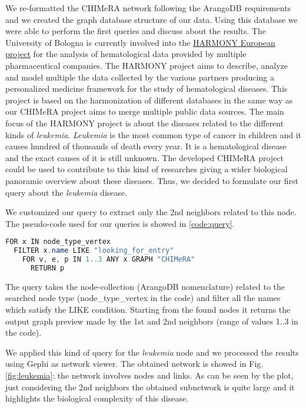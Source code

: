 \documentclass{standalone}
\begin{document}
We re-formatted the \textsf{CHIMeRA} network following the \textsf{ArangoDB} requirements and we created the graph database structure of our data.
Using this database we were able to perform the first queries and discuss about the results.
The University of Bologna is currently involved into the \href{https://www.harmony-alliance.eu/}{HARMONY European project} for the analysis of hematological data provided by multiple pharmaceutical companies.
The HARMONY project aims to describe, analyze and model multiple the data collected by the various partners producing a personalized medicine framework for the study of hematological diseases.
This project is based on the harmonization of different databases in the same way as our \textsf{CHIMeRA} project aims to merge multiple public data sources.
The main focus of the HARMONY project is about the diseases related to the different kinds of \emph{leukemia}.
\emph{Leukemia} is the most common type of cancer in children and it causes hundred of thousands of death every year.
It is a hematological disease and the exact causes of it is still unknown.
The developed \textsf{CHIMeRA} project could be used to contribute to this kind of researches giving a wider biological panoramic overview about these diseases.
Thus, we decided to formulate our first query about the \emph{leukemia} disease.

We customized our query to extract only the 2nd neighbors related to this node.
The pseudo-code used for our queries is showed in \ref{code:query}.

\lstset{style=Java}
\begin{lstlisting}[language=Java, caption=CHIMeRA 2nd neighbors query, label=code:query]
FOR x IN node_type_vertex
  FILTER x.name LIKE "looking_for_entry"
    FOR v, e, p IN 1..3 ANY x GRAPH "CHIMeRA"
      RETURN p
\end{lstlisting}

The query takes the node-collection (\textsf{ArangoDB} nomenclature) related to the searched node type (\textsf{node\_type\_vertex} in the code) and filter all the names which satisfy the \textsf{LIKE} condition.
Starting from the found nodes it returns the output graph preview made by the 1st and 2nd neighbors (range of values \textsf{1..3} in the code).

We applied this kind of query for the \emph{leukemia} node and we processed the results using \textsf{Gephi} as network viewer.
The obtained network is showed in Fig.\ref{fig:leukemia}: the network involves  nodes and  links.
As can be seen by the plot, just considering the 2nd neighbors the obtained subnetwork is quite large and it highlights the biological complexity of this disease.
\end{document}
